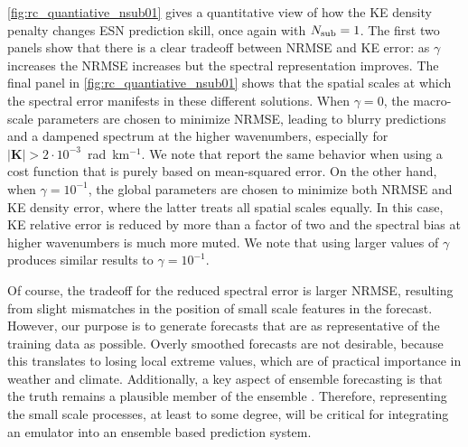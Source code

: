 \cref{fig:rc_quantiative_nsub01} gives a quantitative view of how the KE density
penalty changes ESN prediction skill, once again with $N_\text{sub}=1$.
The first two panels show that there is a clear tradeoff between NRMSE and KE error:
as $\gamma$ increases the NRMSE increases but the spectral representation improves.
The final panel in \cref{fig:rc_quantiative_nsub01}
shows that the spatial scales at which the spectral error manifests in these
different solutions.
When $\gamma=0$, the macro-scale parameters are chosen to minimize NRMSE,
leading to blurry predictions and a dampened spectrum at the higher wavenumbers,
especially for $|\mathbf{K}| > 2\cdot10^{-3}$~rad~km$^{-1}$.
We note that \citet{lam_graphcast_2022} report the same behavior when using a cost function that is purely based on mean-squared error.
On the other hand, when $\gamma = 10^{-1}$, the global parameters are chosen to
minimize both NRMSE and KE density error, where the latter treats all spatial
scales equally.
In this case, KE relative error is reduced by more than a factor of two and the
spectral bias at higher wavenumbers is much more muted.
We note that using larger values of $\gamma$ produces similar results to
$\gamma=10^{-1}$.

Of course, the tradeoff for the reduced spectral error is larger NRMSE, resulting
from slight mismatches in the position of small scale features in the forecast.
However, our purpose is to generate forecasts that are as representative
of the training data as possible.
Overly smoothed forecasts are not desirable, because this translates to losing local extreme values,
which are of practical importance in weather and climate.
Additionally, a key aspect of ensemble forecasting is that the truth remains a
plausible member of the ensemble \citep{kalnay_ensemble_2006}.
Therefore, representing the small scale processes, at least to some degree,
will be critical for integrating an
emulator into an ensemble based prediction system.


